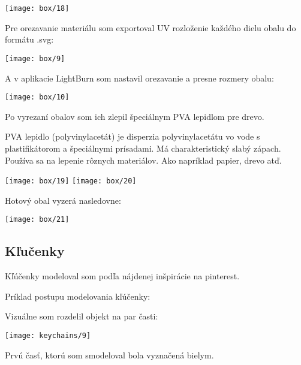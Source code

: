         \begin{center}
          \texttt{[image: box/18]}
        \end{center}

        Pre orezavanie materiálu som exportoval UV rozloženie každého dielu obalu do formátu .svg:

        \begin{center}
          \texttt{[image: box/9]}
        \end{center}

        A v aplikacie LightBurn som nastavil orezavanie a presne rozmery obalu:

        \begin{center}
          \texttt{[image: box/10]}
        \end{center}

        Po vyrezaní obalov som ich zlepil špeciálnym PVA lepidlom pre drevo.

        PVA lepidlo (polyvinylacetát) je disperzia polyvinylacetátu vo vode s plastifikátorom a špeciálnymi prísadami. Má charakteristický slabý zápach. Používa sa na lepenie rôznych materiálov. Ako napríklad papier, drevo atď.

        \begin{center}
          \texttt{[image: box/19]}
          \vfill{}
          \texttt{[image: box/20]}
        \end{center}

        Hotový obal vyzerá nasledovne:

        \begin{center}
          \texttt{[image: box/21]}
        \end{center}
      \subsection{Kľučenky}

        Kľúčenky modeloval som podľa nájdenej inšpirácie na pinterest.

        Príklad postupu modelovania kľúčenky:

        Vizuálne som rozdelil objekt na par časti:

        \begin{center}
          \texttt{[image: keychains/9]}
        \end{center}

        Prvú časť, ktorú som smodeloval bola vyznačená bielym.

